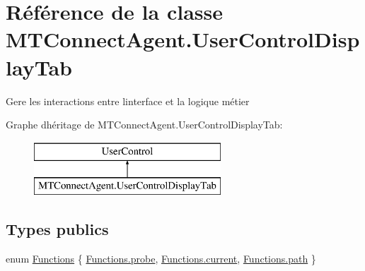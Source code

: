 \hypertarget{class_m_t_connect_agent_1_1_user_control_display_tab}{}\section{Référence de la classe M\+T\+Connect\+Agent.\+User\+Control\+Display\+Tab}
\label{class_m_t_connect_agent_1_1_user_control_display_tab}


Gere les interactions entre l\textquotesingle{}interface et la logique métier  


Graphe d\textquotesingle{}héritage de M\+T\+Connect\+Agent.\+User\+Control\+Display\+Tab\+:\begin{figure}[H]
\begin{center}
\leavevmode
\includegraphics[height=2.000000cm]{class_m_t_connect_agent_1_1_user_control_display_tab}
\end{center}
\end{figure}
\subsection*{Types publics}
\begin{DoxyCompactItemize}
\item 
enum \mbox{\hyperlink{class_m_t_connect_agent_1_1_user_control_display_tab_a39c6241e9b8ef40634f8340676d557ec}{Functions}} \{ \mbox{\hyperlink{class_m_t_connect_agent_1_1_user_control_display_tab_a39c6241e9b8ef40634f8340676d557eca8da843ff65205a61374b09b81ed0fa35}{Functions.\+probe}}, 
\mbox{\hyperlink{class_m_t_connect_agent_1_1_user_control_display_tab_a39c6241e9b8ef40634f8340676d557eca43b5c9175984c071f30b873fdce0a000}{Functions.\+current}}, 
\mbox{\hyperlink{class_m_t_connect_agent_1_1_user_control_display_tab_a39c6241e9b8ef40634f8340676d557ecad6fe1d0be6347b8ef2427fa629c04485}{Functions.\+path}}
 \}
\end{DoxyCompactItemize}
